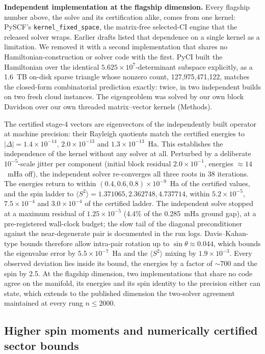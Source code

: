 \documentclass[11pt]{article}
\newcommand{\ssq}{\ensuremath{\langle S^2\rangle}}
\begin{document}
\textbf{Independent implementation at the flagship dimension.} Every flagship number above, the solve and its certification alike, comes from one kernel: PySCF's \texttt{kernel\_fixed\_space}, the matrix-free selected-CI engine that the released solver wraps. Earlier drafts listed that dependence on a single kernel as a limitation. We removed it with a second implementation that shares no Hamiltonian-construction or solver code with the first. PyCI built the Hamiltonian over the identical $5.625\times10^7$-determinant subspace explicitly, as a 1.6~TB on-disk sparse triangle whose nonzero count, 127{,}975{,}471{,}122, matches the closed-form combinatorial prediction exactly: twice, in two independent builds on two fresh cloud instances. The eigenproblem was solved by our own block Davidson over our own threaded matrix--vector kernels (Methods).

The certified stage-4 vectors are eigenvectors of the independently built operator at machine precision: their Rayleigh quotients match the certified energies to $|\Delta| = 1.4\times10^{-14}$, $2.0\times10^{-13}$ and $1.3\times10^{-13}$~Ha. This establishes the independence of the kernel without any solver at all. Perturbed by a deliberate $10^{-5}$-scale jitter per component (initial block residual $2.0\times10^{-1}$, energies ${\approx}14$~mHa off), the independent solver re-converges all three roots in 38 iterations. The energies return to within $(0.4, 0.6, 0.8)\times10^{-9}$~Ha of the certified values, and the spin ladder to $\ssq = 1.371065, 2.362748, 4.737714$, within $5.2\times10^{-5}$, $7.5\times10^{-4}$ and $3.0\times10^{-4}$ of the certified ladder. The independent solve stopped at a maximum residual of $1.25\times10^{-5}$ (4.4\% of the 0.285~mHa ground gap), at a pre-registered wall-clock budget; the slow tail of the diagonal preconditioner against the near-degenerate pair is documented in the run logs. Davis--Kahan-type bounds therefore allow intra-pair rotation up to $\sin\theta \approx 0.044$, which bounds the eigenvalue error by $5.5\times10^{-7}$~Ha and the \ssq{} mixing by $1.9\times10^{-3}$. Every observed deviation lies inside its bound, the energies by a factor of ${\sim}700$ and the spin by 2.5. At the flagship dimension, two implementations that share no code agree on the manifold, its energies and its spin identity to the precision either can state, which extends to the published dimension the two-solver agreement maintained at every rung $n \le 2000$.

\subsection{Higher spin moments and numerically certified sector bounds}\label{sec:crossinst}
\end{document}
